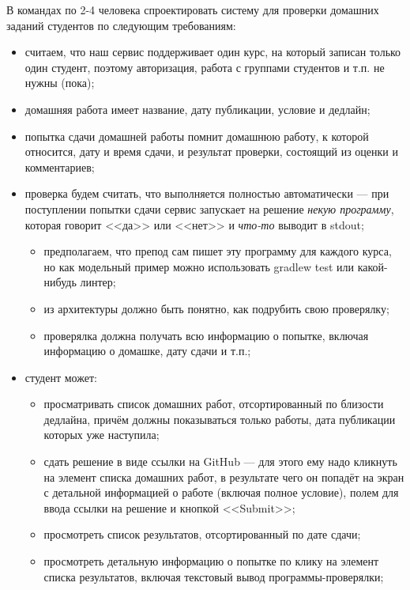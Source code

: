 \documentclass[a5paper]{homework}
\begin{document}

В командах по 2-4 человека спроектировать систему для проверки домашних заданий студентов по следующим требованиям:

\begin{itemize}
    \item считаем, что наш сервис поддерживает один курс, на который записан только один студент, поэтому авторизация, работа с группами студентов и т.п. не нужны (пока);
    \item домашняя работа имеет название, дату публикации, условие и дедлайн;
    \item попытка сдачи домашней работы помнит домашнюю работу, к которой относится, дату и время сдачи, и результат проверки, состоящий из оценки и комментариев;
    \item проверка будем считать, что выполняется полностью автоматически --- при поступлении попытки сдачи сервис запускает на решение \textit{некую программу}, которая говорит <<да>> или <<нет>> и \emph{что-то} выводит в stdout;
    \begin{itemize}
        \item предполагаем, что препод сам пишет эту программу для каждого курса, но как модельный пример можно использовать gradlew test или какой-нибудь линтер;
        \item из архитектуры должно быть понятно, как подрубить свою проверялку;
        \item проверялка должна получать всю информацию о попытке, включая информацию о домашке, дату сдачи и т.п.;
    \end{itemize}
    \item студент может:
    \begin{itemize}
        \item просматривать список домашних работ, отсортированный по близости дедлайна, причём должны показываться только работы, дата публикации которых уже наступила;
        \item сдать решение в виде ссылки на GitHub --- для этого ему надо кликнуть на элемент списка домашних работ, в результате чего он попадёт на экран с детальной информацией о работе (включая полное условие), полем для ввода ссылки на решение и кнопкой <<Submit>>;
        \item просмотреть список результатов, отсортированный по дате сдачи;
        \item просмотреть детальную информацию о попытке по клику на элемент списка результатов, включая текстовый вывод программы-проверялки;

\end{itemize}
\end{itemize}
\end{document}
